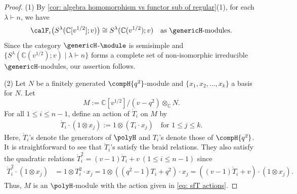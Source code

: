 \documentclass[12pt, reqno]{amsart}
\theoremstyle{plain}
\theoremstyle{definition}
\numberwithin{equation}{section}
\numberwithin{figure}{section}
\numberwithin{table}{section}
\def\C{\mathbb C}
\begin{document}
\begin{proof}
(1)
By \cref{cor: algebra homomorphism vs functor sub of regular}(1), for each $\lambda \vdash n$, we have 
\begin{equation*}
\calF_\iota\bigl(S^{\lambda}(\C[v^{1/2}];v)\bigr) \cong S^{\lambda}(\C(v^{1/2});v) 
\quad \text{as $\genericH$-modules.}
\end{equation*}
Since the category $\genericH$-$\module$ is semisimple and 
$\{ S^{\lambda}(\C(v^{1/2});v) \mid \lambda \vdash  n \}$
forms a complete set of non-isomorphic irreducible $\genericH$-modules, our assertion follows.

\medskip

(2) 
Let $N$ be a finitely generated  $\compH{q^2}$-module
and $\{x_1, x_2, \ldots, x_k\}$ a basis for $N$.
Let 
\begin{equation*}
M := \C[v^{1/2}]/(v - q^2) \otimes_{\C} N.
\end{equation*}
For all $1 \leq i \leq n-1$, define an action of $\mathring{T}_i$ on $M$ by
\begin{align}\label{eq: sfT actions}
\mathring{T}_i \cdot (1 \otimes x_j) := 1 \otimes (T_i \cdot x_j) \quad \text{for $1 \le j \le k$.}
\end{align}
Here, $\mathring{T}_i$'s denote the generators of $\polyH$ and $T_i$'s denote those of $\compH{q^2}$.
It is straightforward to see that $\mathring{T}_i$'s satisfy the braid relations.
They also satisfy the quadratic relations
$\mathring{T}_i^2 = (v - 1) \mathring{T}_i + v~(1 \le i \le n-1)$ since 
\begin{align*}
\mathring{T}_i^2 \cdot (1 \otimes x_j)
& = 1 \otimes T_i^2 \cdot x_j = 1 \otimes ((q^2-1)T_i + q^2)\cdot x_j
= ((v-1) \mathring{T}_i + v) \cdot (1 \otimes x_j).
\end{align*}
Thus, $M$ is an $\polyH$-module with the action given in 
\cref{eq: sfT actions}.





\end{proof}
\end{document}

